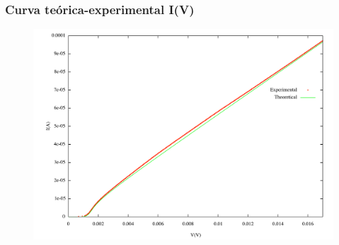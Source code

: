 \begin{frame}
\frametitle{Curva te\'orica-experimental I(V)}

\begin{figure}[!h] \label{iv_teo_exp}
\includegraphics[width=\textwidth]{iv_theo_exp}
\end{figure}

\end{frame}


